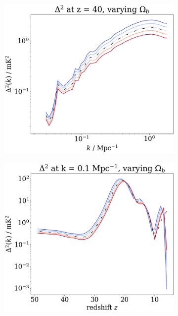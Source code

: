 \documentclass[floats,floatfix,showpacs,amssymb,prd,superscriptaddress,nofootinbib]{revtex4-2} %
\begin{document}
\begin{figure}[H]
     \hfill
     \begin{subfigure}[b]{0.45\textwidth}
         \centering
         \includegraphics[width=\textwidth]{images/simulation_results/power_spectrum_fixed_z_40_Ob.png}
         \label{fig:power_spectrum_fixed_z_40_Ob}
     \end{subfigure}
     \hfill
     \begin{subfigure}[b]{0.45\textwidth}
         \centering
         \includegraphics[width=\textwidth]{images/simulation_results/power_spectrum_fixed_k_0.1_Ob.png}

\end{subfigure}
\end{figure}
\end{document}
